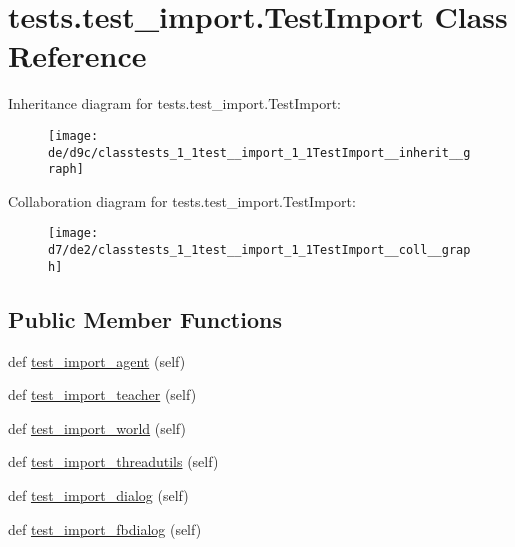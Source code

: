 \hypertarget{classtests_1_1test__import_1_1TestImport}{}\section{tests.\+test\+\_\+import.\+Test\+Import Class Reference}
\label{classtests_1_1test__import_1_1TestImport}


Inheritance diagram for tests.\+test\+\_\+import.\+Test\+Import\+:
\nopagebreak
\begin{figure}[H]
\begin{center}
\leavevmode
\texttt{[image: de/d9c/classtests\_1\_1test\_\_import\_1\_1TestImport\_\_inherit\_\_graph]}
\end{center}
\end{figure}


Collaboration diagram for tests.\+test\+\_\+import.\+Test\+Import\+:
\nopagebreak
\begin{figure}[H]
\begin{center}
\leavevmode
\texttt{[image: d7/de2/classtests\_1\_1test\_\_import\_1\_1TestImport\_\_coll\_\_graph]}
\end{center}
\end{figure}
\subsection*{Public Member Functions}
\begin{DoxyCompactItemize}
\item 
def \hyperlink{classtests_1_1test__import_1_1TestImport_acfd2119a3ad738cad370cf72ef7e7423}{test\+\_\+import\+\_\+agent} (self)
\item 
def \hyperlink{classtests_1_1test__import_1_1TestImport_af48db1b740c81424df27e10c66481770}{test\+\_\+import\+\_\+teacher} (self)
\item 
def \hyperlink{classtests_1_1test__import_1_1TestImport_a7eb4091dcd3395e147659ec3a49be488}{test\+\_\+import\+\_\+world} (self)
\item 
def \hyperlink{classtests_1_1test__import_1_1TestImport_a3a90634703bb67d0bb0b3ac5352657ad}{test\+\_\+import\+\_\+threadutils} (self)
\item 
def \hyperlink{classtests_1_1test__import_1_1TestImport_a5dcc13dee044ad4be07523f024b13db2}{test\+\_\+import\+\_\+dialog} (self)
\item 
def \hyperlink{classtests_1_1test__import_1_1TestImport_ad030b185d0f0b02e1d8606d578d48820}{test\+\_\+import\+\_\+fbdialog} (self)
\end{DoxyCompactItemize}


